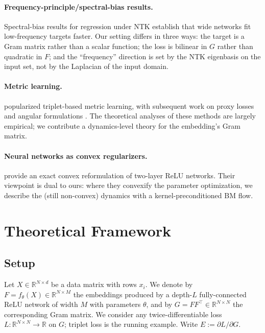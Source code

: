 \documentclass[11pt,letterpaper]{article}
\newcommand{\R}{\mathbb{R}}
\newcommand{\E}{E}
\begin{document}
\paragraph{Frequency-principle/spectral-bias results.}
Spectral-bias results for regression under NTK
\citep{rahaman2019spectral,basri2020frequency} establish that wide networks
fit low-frequency targets faster. Our setting differs in three ways: the
target is a Gram matrix rather than a scalar function; the loss is bilinear
in $G$ rather than quadratic in $F$; and the ``frequency'' direction is set
by the NTK eigenbasis on the input set, not by the Laplacian of the input
domain.

\paragraph{Metric learning.}
\citet{schroff2015facenet,weinberger2009distance} popularized triplet-based
metric learning, with subsequent work on proxy losses
\citep{movshovitz2017no} and angular formulations \citep{wang2017deep}. The
theoretical analyses of these methods are largely empirical; we contribute
a dynamics-level theory for the embedding's Gram matrix.

\paragraph{Neural networks as convex regularizers.}
\citet{pilanci2020neural} provide an exact convex reformulation of two-layer
ReLU networks. Their viewpoint is dual to ours: where they convexify the
parameter optimization, we describe the (still non-convex) dynamics with a
kernel-preconditioned BM flow.

\section{Theoretical Framework}
\label{sec:theory}

\subsection{Setup}

Let $X \in \R^{N \times d}$ be a data matrix with rows $x_i$. We denote by
$F = f_\theta(X) \in \R^{N \times M}$ the embeddings produced by a depth-$L$
fully-connected ReLU network of width $M$ with parameters $\theta$, and by
$G = FF^\top \in \R^{N \times N}$ the corresponding Gram matrix. We
consider any twice-differentiable loss $L : \R^{N \times N} \to \R$ on $G$;
triplet loss is the running example. Write $\E := \partial L / \partial G$.
\end{document}
